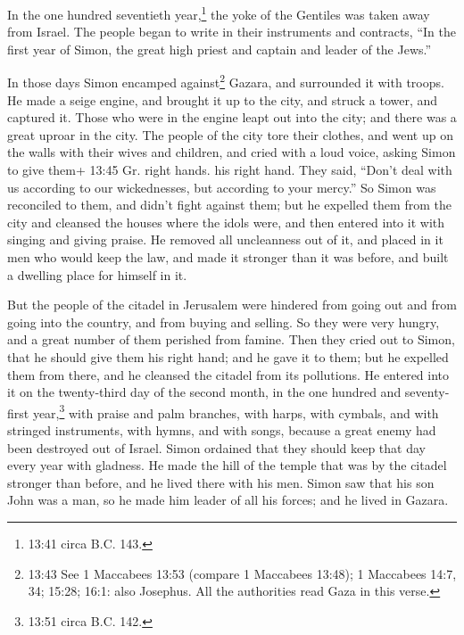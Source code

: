  In the one hundred seventieth year,\footnote{13:41 circa
  B.C. 143.} the yoke of the Gentiles was taken away from Israel.
 The people began to write in their instruments and
contracts, ``In the first year of Simon, the great high priest and
captain and leader of the Jews.''

 In those days Simon encamped against\footnote{13:43 See 1
  Maccabees 13:53 (compare 1 Maccabees 13:48); 1 Maccabees 14:7, 34;
  15:28; 16:1: also Josephus. All the authorities read Gaza in this
  verse.} Gazara, and surrounded it with troops. He made a seige engine,
and brought it up to the city, and struck a tower, and captured it.
 Those who were in the engine leapt out into the city; and
there was a great uproar in the city.  The people of the
city tore their clothes, and went up on the walls with their wives and
children, and cried with a loud voice, asking Simon to give them+ 13:45
Gr. right hands. his right hand.  They said, ``Don't deal
with us according to our wickednesses, but according to your mercy.''
 So Simon was reconciled to them, and didn't fight against
them; but he expelled them from the city and cleansed the houses where
the idols were, and then entered into it with singing and giving praise.
 He removed all uncleanness out of it, and placed in it men
who would keep the law, and made it stronger than it was before, and
built a dwelling place for himself in it.

 But the people of the citadel in Jerusalem were hindered
from going out and from going into the country, and from buying and
selling. So they were very hungry, and a great number of them perished
from famine.  Then they cried out to Simon, that he should
give them his right hand; and he gave it to them; but he expelled them
from there, and he cleansed the citadel from its pollutions.
 He entered into it on the twenty-third day of the second
month, in the one hundred and seventy-first year,\footnote{13:51 circa
  B.C. 142.} with praise and palm branches, with harps, with cymbals,
and with stringed instruments, with hymns, and with songs, because a
great enemy had been destroyed out of Israel.  Simon
ordained that they should keep that day every year with gladness. He
made the hill of the temple that was by the citadel stronger than
before, and he lived there with his men.  Simon saw that
his son John was a man, so he made him leader of all his forces; and he
lived in Gazara.

